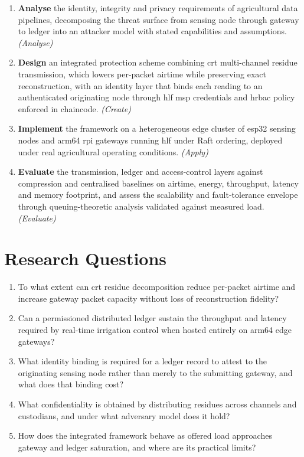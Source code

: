 \documentclass[12pt,a4paper,oneside]{book}
\begin{document}
\begin{enumerate}
  \item \textbf{Analyse} the identity, integrity and privacy requirements of
        agricultural data pipelines, decomposing the threat surface from
        sensing node through gateway to ledger into an attacker model with
        stated capabilities and assumptions. \textit{(Analyse)}

  \item \textbf{Design} an integrated protection scheme combining \gls{crt}
        multi-channel residue transmission, which lowers per-packet airtime
        while preserving exact reconstruction, with an identity layer that
        binds each reading to an authenticated originating node through
        \gls{hlf} \gls{msp} credentials and \gls{hrbac} policy enforced in
        chaincode. \textit{(Create)}

  \item \textbf{Implement} the framework on a heterogeneous edge cluster of
        \gls{esp32} sensing nodes and \gls{arm64} \gls{rpi} gateways running
        \gls{hlf} under Raft ordering, deployed under real agricultural
        operating conditions. \textit{(Apply)}

  \item \textbf{Evaluate} the transmission, ledger and access-control layers
        against compression and centralised baselines on airtime, energy,
        throughput, latency and memory footprint, and assess the scalability
        and fault-tolerance envelope through queuing-theoretic analysis
        validated against measured load. \textit{(Evaluate)}
\end{enumerate}

\section{Research Questions}
\label{sec:research_questions}

\begin{enumerate}[label=\textbf{RQ\arabic*.}]
  \item To what extent can \gls{crt} residue decomposition reduce per-packet
        airtime and increase gateway packet capacity without loss of
        reconstruction fidelity?
  \item Can a permissioned distributed ledger sustain the throughput and latency
        required by real-time irrigation control when hosted entirely on
        \gls{arm64} edge gateways?
  \item What identity binding is required for a ledger record to attest to the
        originating sensing node rather than merely to the submitting gateway,
        and what does that binding cost?
  \item What confidentiality is obtained by distributing residues across
        channels and custodians, and under what adversary model does it hold?
  \item How does the integrated framework behave as offered load approaches
        gateway and ledger saturation, and where are its practical limits?
\end{enumerate}
\end{document}
